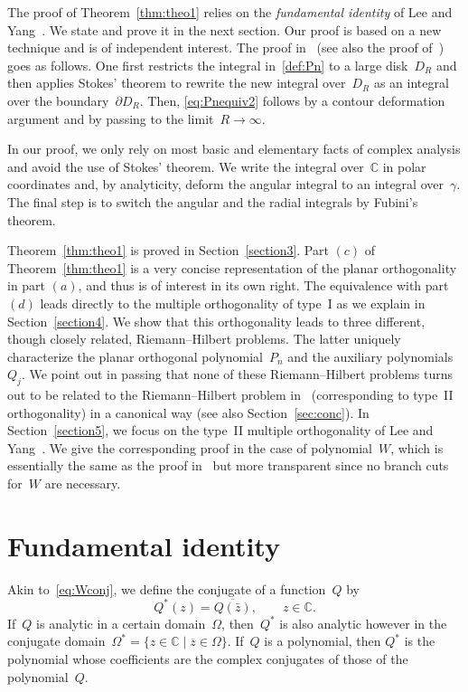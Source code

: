 \documentclass[pdftex]{sigma}
\numberwithin{equation}{section}
\newcommand*{\Cset}{\mathbb{C}} %
\begin{document}
 The proof of Theorem~\ref{thm:theo1} relies on the \textit{fundamental identity} of Lee and Yang~\cite[Proposition~1]{LY2}. We state and prove it in the next section. Our proof is based on a new technique and is of independent interest. The proof in~\cite{LY2} (see also the proof of~\cite[Lemma 3.1]{BBLM}) goes as follows. One first restricts the integral in~\eqref{def:Pn} to a large disk~$D_R$ and then applies Stokes' theorem to rewrite the new integral over~$D_R$ as an integral over the boundary~$\partial D_R$. Then, \eqref{eq:Pnequiv2} follows by a contour deformation argument and by passing to the limit~$R \to \infty$.

 In our proof, we only rely on most basic and elementary facts of complex analysis and avoid the use of Stokes' theorem. We write the integral over~$\Cset$ in polar coordinates and, by analyticity, deform the angular integral to an integral over~$\gamma$. The final step is to switch the angular and the radial integrals by Fubini's theorem.

 Theorem~\ref{thm:theo1} is proved in Section~\ref{section3}. Part $(c)$ of Theorem~\ref{thm:theo1} is a very concise
 representation of the planar orthogonality in part $(a)$, and thus is of interest in its own right. The equivalence
 with part $(d)$ leads directly to the multiple orthogonality of type~I as we explain in Section~\ref{section4}.
 We show that this orthogonality leads to three different, though closely related, Riemann--Hilbert problems.
 The latter uniquely characterize the planar orthogonal polynomial~$P_n$ and the auxiliary polynomials~$Q_j$.
 We point out in passing that none of these Riemann--Hilbert problems turns out to be related to the Riemann--Hilbert
 problem in~\cite{LY2} (corresponding to type~II orthogonality) in a canonical way (see also Section~\ref{sec:conc}).
 In Section~\ref{section5}, we focus on the type~II multiple orthogonality of Lee and Yang~\cite{LY2}. We give the
 corresponding proof in the case of polynomial~$W$, which is essentially the same as the proof
 in~\cite{LY2} but more transparent since no branch cuts for~$W$ are necessary.



 \section{Fundamental identity}

 Akin to~\eqref{eq:Wconj}, we define the conjugate of a function~$Q$ by
 \begin{equation}
 \label{eq:Qconj}
 Q^*(z) = \overline{Q(\bar{z})}, \qquad z \in \Cset.
 \end{equation}
 If~$Q$ is analytic in a certain domain~$\Omega$, then~$Q^*$ is also analytic however in the conjugate domain~$\Omega^* = \{z\in \Cset \mid \overline{z} \in \Omega\}$. If~$Q$ is a polynomial, then $Q^*$ is the polynomial whose coefficients are the complex conjugates of those of the polynomial~$Q$.
\end{document}
